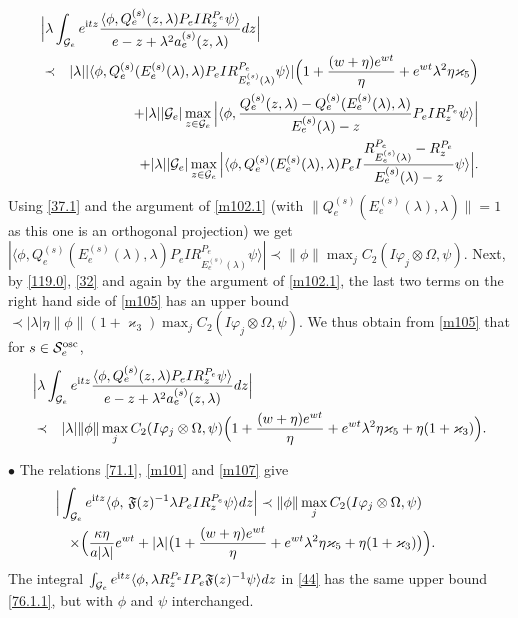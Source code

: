\documentclass[letterpaper,onecolumn,11pt,accepted=2021-12-09]{quantumarticle}
\numberwithin{equation}{section}
\newcommand{\aes}{a_e^{(s)}}
\newcommand{\Qes}{Q_e^{(s)}}
\newcommand{\Ees}{E_e^{(s)}(\lambda)}
\renewcommand{\i}{{\rm i}}
\begin{document}
\begin{eqnarray}
\lefteqn{
\Big|\lambda  \int_{{\mathcal G}_e} e^{\i tz}\frac{ \langle\phi, \Qes(z,\lambda)P_e IR^{P_e}_z \psi\rangle  }{e-z+\lambda^2 \aes(z,\lambda)} dz\Big|}\nonumber\\
&\prec& |\lambda| |  \langle \phi, \Qes(\Ees,\lambda)P_eIR_{\Ees}^{P_e}\psi\rangle| \Big( 1+ \frac{(w+\eta) e^{wt}}{\eta}+ e^{wt}\lambda^2\eta\varkappa_5\Big) \nonumber\\
&& + |\lambda| |{\mathcal G}_e| \max_{z\in{\mathcal G}_e} \Big| \langle \phi, \frac{\Qes(z,\lambda)-\Qes(\Ees,\lambda)}{\Ees-z} P_eIR_z^{P_e} \psi\rangle \Big|  \nonumber\\
&& + |\lambda| |{\mathcal G}_e| \max_{z\in{\mathcal G}_e} \Big|\langle \phi, \Qes(\Ees,\lambda) P_eI \frac{R^{P_e}_{\Ees} - R_z^{P_e}}{\Ees-z} \psi\rangle \Big|.
\label{m105}
\end{eqnarray}
Using \eqref{37.1} and the argument of \eqref{m102.1} (with  $\|\Qes(\Ees,\lambda)\| =1$ as this one is an orthogonal projection) we get $|  \langle \phi, \Qes(\Ees,\lambda)P_eIR_{\Ees}^{P_e}\psi\rangle | 
\prec  \|\phi\| \max_j C_2(I\varphi_j\otimes\Omega,\psi)$.
Next, by \eqref{119.0}, \eqref{32} and again by the argument of \eqref{m102.1}, the last two terms on the right hand side of \eqref{m105} has an upper bound
$\prec |\lambda| \eta  \|\phi\|  (1+ \varkappa_3) \max_j C_2(I\varphi_j\otimes\Omega, \psi)$. We thus obtain from \eqref{m105} that for $s\in{\mathcal S}_e^{\rm osc}$,
\begin{eqnarray}
	\lefteqn{
		\Big|\lambda  \int_{{\mathcal G}_e} e^{\i tz}\frac{ \langle\phi, \Qes(z,\lambda)P_e IR^{P_e}_z \psi\rangle  }{e-z+\lambda^2 \aes(z,\lambda)} dz\Big|
	}\label{m107}\\
&\prec& |\lambda| \|\phi\| \max_j C_2(I\varphi_j\otimes\Omega,\psi)\Big(1+ \frac{(w+\eta) e^{wt}}{\eta} +e^{wt}\lambda^2\eta\varkappa_5 +\eta(1+\varkappa_3) \Big).
	\nonumber
\end{eqnarray}

$\bullet$  The relations \eqref{71.1}, \eqref{m101} and \eqref{m107}  give 
\begin{eqnarray}
\lefteqn{\Big|\int_{{\mathcal G}_e} e^{\i tz}\langle \phi,   \, {\mathfrak F}(z)^{-1} \lambda P_e I R_z^{P_e} \psi\rangle dz \Big|\prec \|\phi\|  \max_j C_2(I\varphi_j\otimes\Omega,\psi)}\nonumber\\
&& \times \Big( \frac{\kappa\eta}{a|\lambda|} e^{wt} + |\lambda|\big( 1+ \frac{(w+\eta) e^{wt}}{\eta} +e^{wt}\lambda^2\eta\varkappa_5 +\eta(1+\varkappa_3)\big)\Big).\qquad
\label{76.1.1}
\end{eqnarray}
The integral $\int_{{\mathcal G}_e} e^{\i tz}\langle \phi,  \lambda R_z^{P_e} I P_e {\mathfrak F}(z)^{-1} \psi\rangle dz $  in \eqref{44} has the same upper bound \eqref{76.1.1}, but with $\phi$ and $\psi$ interchanged.
\medskip
\end{document}
